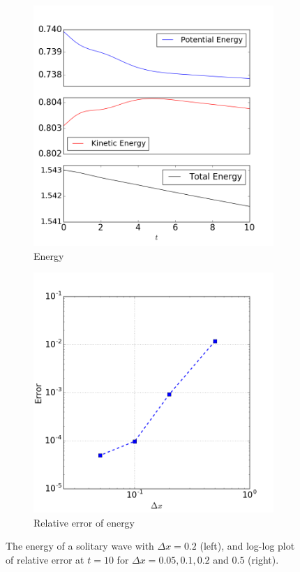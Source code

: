 \documentclass[review]{elsarticle}
\begin{document}
\begin{figure}[!htb]
    \centering
    \begin{subfigure}[b]{0.45\textwidth}
        \includegraphics[width=\textwidth]{_fig/soliton_energy.png}
        \caption{Energy}
        \label{fig:soliton_energy}
    \end{subfigure}
    \begin{subfigure}[b]{0.45\textwidth}
        \includegraphics[width=\textwidth]{_fig/soliton_energy_dx.png}
        \caption{Relative error of energy}
        \label{fig:soliton_energy_dx}
    \end{subfigure}
    \caption{The energy of a solitary wave
    with $\Delta x = 0.2$ (left), 
    and log-log plot of relative error 
    at $t=10$ for $\Delta x = 0.05, 0.1, 0.2$ and $0.5$ (right).}
    \label{fig:soliton_error_energy}
\end{figure}
\end{document}
